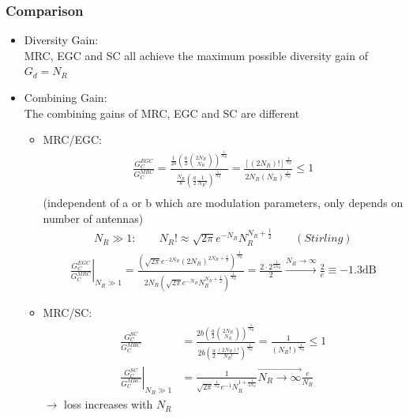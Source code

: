 \documentclass[a4paper, 10pt]{article}
\begin{document}
\subsubsection{Comparison}
	\begin{itemize}
		\item Diversity Gain:\\
			MRC, EGC and SC all achieve the maximum possible diversity gain of $G_d=N_R$
		\item Combining Gain:\\
			The combining gains of MRC, EGC and SC are different
			\begin{itemize}
			\item MRC/EGC:
			\begin{align*}
			\frac{G_C^{EGC}}{G_C^{MRC}}=\frac{\frac{1}{2b}\left(\frac{a}{2}\binom{2N_R}{N_R}\right)^{\frac{1}{N_R}}}{\frac{N_R}{b}\left(\frac{a}{2}\frac{1}{N_R!}\right)^{\frac{1}{N_R}}}
			=\frac{[(2N_R)!]^{\frac{1}{N_R}}}{2N_R(N_R)^{\frac{1}{N_R}}}\leq 1\\
			\end{align*}
			(independent of a or b which are modulation parameters, only depends on number of antennas)
			\begin{align*}
				N_R \gg 1: \qquad N_R!\approx \sqrt{2\pi}e^{-N_R}N_R^{N_R+\frac{1}{2}}\qquad(Stirling)
			\end{align*}
			\begin{align*}
				\left.\frac{G_C^{EGC}}{G_C^{MRC}}\right|_{N_R\gg1}
				=\frac{\left(\sqrt{2\pi}e^{-2N_R}(2N_R)^{2N_R+\frac{1}{2}}\right)^{\frac{1}{N_R}}}{2N_R\left(\sqrt{2\pi}e^{-N_R}N_R^{N_R+\frac{1}{2}}\right)^{\frac{1}{N_R}}}
				=\frac{2\cdot2^{\frac{1}{2N_R}}}{2}\overset{N_R\rightarrow\infty}{\rightarrow}\frac{2}{e}\equiv -1.3\mathrm{dB}
			\end{align*}
			\item MRC/SC:
			\begin{align*}
				\frac{G_C^{SC}}{G_C^{MRC}}
				&=\frac{2b\left(\frac{a}{2}\binom{2N_R}{N_R}\right)^{\frac{1}{N_R}}}{2b\left(\frac{a}{2}\frac{(2N_R)!}{N_R!}\right)^{\frac{1}{N_R}}}
				=\frac{1}{(N_R!)^{\frac{1}{N_R}}} \leq 1\\
				\left.\frac{G_C^{SC}}{G_C^{MRC}}\right|_{N_R\gg1}&=\frac{1}{\sqrt{2\pi}^{\frac{1}{N_R}}e^{-1}N_R^{1+\frac{1}{2N_R}}}\overset{\rightarrow}{N_R\rightarrow\infty}\frac{e}{N_R}
			\end{align*}
			$\rightarrow$ loss increases with $N_R$
			\end{itemize}
	\end{itemize}
	\newpage
\end{document}
